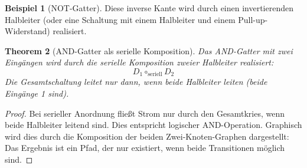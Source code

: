 \documentclass[12pt, a4paper]{article}
\newtheorem{theorem}{Theorem}[section]
\theoremstyle{definition}
\newtheorem{example}[theorem]{Beispiel}
\theoremstyle{remark}
\begin{document}
\begin{example}[NOT-Gatter]
 
 
 
 

Diese inverse Kante wird durch einen invertierenden Halbleiter (oder eine Schaltung mit einem Halbleiter und einem Pull-up-Widerstand) realisiert.
\end{example}

\begin{theorem}[AND-Gatter als serielle Komposition]
\label{thm:and_gatter}
Das AND-Gatter mit zwei Eingängen wird durch die serielle Komposition zweier Halbleiter realisiert:
\[
  D_1 \circ_{\mathrm{seriell}} D_2
\]
Die Gesamtschaltung leitet nur dann, wenn beide Halbleiter leiten (beide Eingänge 1 sind).
\end{theorem}

\begin{proof}
Bei serieller Anordnung fließt Strom nur durch den Gesamtkries, wenn beide Halbleiter leitend sind. Dies entspricht logischer AND-Operation. Graphisch wird dies durch die Komposition der beiden Zwei-Knoten-Graphen dargestellt: Das Ergebnis ist ein Pfad, der nur existiert, wenn beide Transitionen möglich sind.
\end{proof}
\end{document}
